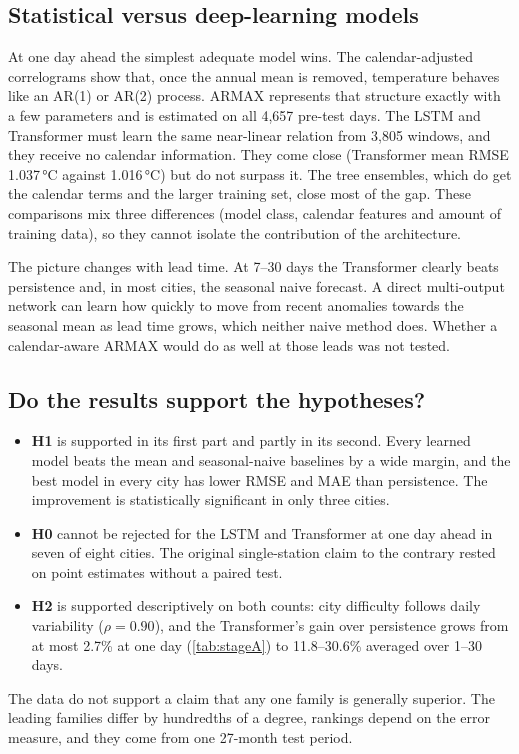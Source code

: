 \documentclass[11pt,a4paper]{article}
\newcommand{\degC}{\,\si{\degreeCelsius}}
\begin{document}
\subsection{Statistical versus deep-learning models}

At one day ahead the simplest adequate model wins. The calendar-adjusted correlograms show that, once the annual mean is removed, temperature behaves like an AR(1) or AR(2) process. ARMAX represents that structure exactly with a few parameters and is estimated on all 4{,}657 pre-test days. The LSTM and Transformer must learn the same near-linear relation from 3{,}805 windows, and they receive no calendar information. They come close (Transformer mean RMSE 1.037\degC{} against 1.016\degC) but do not surpass it. The tree ensembles, which do get the calendar terms and the larger training set, close most of the gap. These comparisons mix three differences (model class, calendar features and amount of training data), so they cannot isolate the contribution of the architecture.

The picture changes with lead time. At 7--30 days the Transformer clearly beats persistence and, in most cities, the seasonal naive forecast. A direct multi-output network can learn how quickly to move from recent anomalies towards the seasonal mean as lead time grows, which neither naive method does. Whether a calendar-aware ARMAX would do as well at those leads was not tested.

\subsection{Do the results support the hypotheses?}

\begin{itemize}
  \item \textbf{H1} is supported in its first part and partly in its second. Every learned model beats the mean and seasonal-naive baselines by a wide margin, and the best model in every city has lower RMSE and MAE than persistence. The improvement is statistically significant in only three cities.
  \item \textbf{H0} cannot be rejected for the LSTM and Transformer at one day ahead in seven of eight cities. The original single-station claim to the contrary rested on point estimates without a paired test.
  \item \textbf{H2} is supported descriptively on both counts: city difficulty follows daily variability ($\rho = 0.90$), and the Transformer's gain over persistence grows from at most 2.7\% at one day (\cref{tab:stageA}) to 11.8--30.6\% averaged over 1--30 days.
\end{itemize}
The data do not support a claim that any one family is generally superior. The leading families differ by hundredths of a degree, rankings depend on the error measure, and they come from one 27-month test period.
\end{document}
